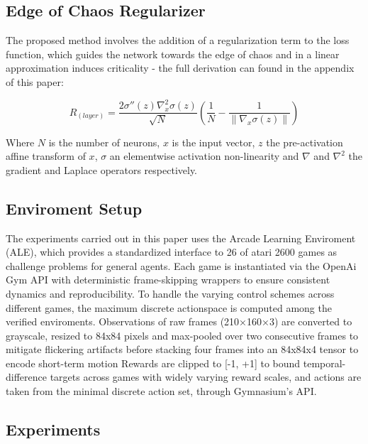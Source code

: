 \subsection{Edge of Chaos Regularizer}

The proposed method involves the addition of a regularization term to the loss function, which guides the network towards the edge of chaos and in a linear approximation induces criticality - the full derivation can found in the appendix of this paper:

\begin{equation}
R_{(layer)} = \dfrac{2\sigma''(z)\nabla_x^2\sigma(z)}{\sqrt{N}}\left(\dfrac{1}{N}-\dfrac{1}{\|\nabla_x \sigma(z)\|}\right)
\end{equation}

Where $N$ is the number of neurons, $x$ is the input vector, $z$ the pre-activation affine transform of $x$, $\sigma$ an elementwise activation non-linearity and $\nabla$ and $\nabla^2$ the gradient and Laplace operators respectively.

\subsection{Enviroment Setup}

The experiments carried out in this paper uses the Arcade Learning Enviroment (ALE), which provides a standardized interface to 26 of atari 2600 games as challenge problems for general agents\cite{Bellemare_2013}.
Each game is instantiated via the OpenAi Gym API with deterministic frame-skipping wrappers to ensure consistent dynamics and reproducibility.
To handle the varying control schemes across different games, the maximum discrete actionspace is computed among the verified enviroments.
Observations of raw frames (210×160×3) are converted to grayscale, resized to 84x84 pixels and max-pooled over two consecutive frames to mitigate flickering artifacts before stacking four  frames into an 84x84x4 tensor to encode short-term motion\cite{terry2020arcade}
Rewards are clipped to [-1, +1] to bound temporal-difference targets across games with widely varying reward scales, and actions are taken from the minimal discrete action set, through Gymnasium's API.

\subsection{Experiments}